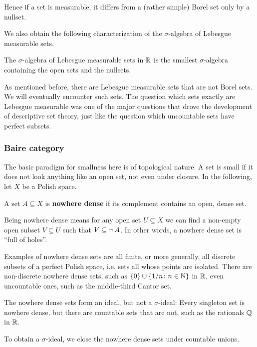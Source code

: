 Hence if a set is measurable, it differs from a (rather simple) Borel set only by a nullset.

We also obtain the following characterization of the $\sigma$-algebra of Lebesgue measurable sets.

\begin{proposition}\label{prop-measurable-sigma-algebra}The $\sigma$-algebra of Lebesgue measurable sets in $\mathbb{R}$ is the smallest $\sigma$-algebra containing the open sets and the nullsets.

\end{proposition}As mentioned before, there are Lebesgue measurable sets that are not Borel sets. We will eventually encounter such sets. The question which sets exactly are Lebesgue measurable was one of the major questions that drove the development of descriptive set theory, just like the question which uncountable sets have perfect subsets.

\subsubsection{Baire category}

The basic paradigm for smallness here is of topological nature. A set is small if it does not look anything like an open set, not even under closure. In the following, let $X$ be a Polish space.

\begin{definition}\label{def-nowhere-dense}A set $A \subseteq X$ is \textbf{nowhere dense} if its complement contains an open, dense set.

\end{definition}Being nowhere dense means for any open set $U \subseteq X$ we can find a non-empty open subset $V \subseteq U$ such that $V \subseteq \neg \, A$. In other words, a nowhere dense set is ``full of holes''.

Examples of nowhere dense sets are all finite, or more generally, all discrete subsets of a perfect Polish space, i.e. sets all whose points are isolated. There are non-discrete nowhere dense sets, such as $\{0\} \cup \{1/n \colon n \in \mathbb{N} \}$ in $\mathbb{R}$, even uncountable ones, such as the middle-third Cantor set.

The nowhere dense sets form an ideal, but not a $\sigma$-ideal: Every singleton set is nowhere dense, but there are countable sets that are not, such as the rationals $\mathbb{Q}$ in $\mathbb{R}$.

To obtain a $\sigma$-ideal, we close the nowhere dense sets under countable unions.

